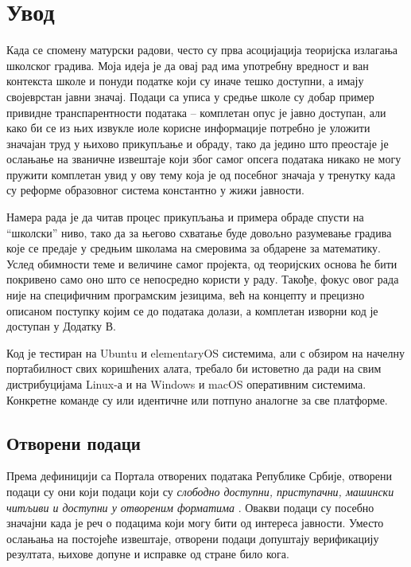 \chapter{Увод}\label{ch:\thechapter}

Када се спомену матурски радови, често су прва асоцијација теоријска излагања школског градива. Моја идеја је да овај рад има употребну вредност и ван контекста школе и понуди податке који су иначе тешко доступни, а имају својеврстан јавни значај. Подаци са уписа у средње школе су добар пример привидне транспарентности података -- комплетан опус је јавно доступан, али како би се из њих извукле иоле корисне информације потребно је уложити значајан труд у њихово прикупљање и обраду, тако да једино што преостаје је ослањање на званичне извештаје који због самог опсега података никако не могу пружити комплетан увид у ову тему која је од посебног значаја у тренутку када су реформе образовног система константно у жижи јавности.

Намера рада је да читав процес прикупљања и примера обраде спусти на \enquote{школски} ниво, тако да за његово схватање буде довољно разумевање градива које се предаје у средњим школама на смеровима за обдарене за математику. Услед обимности теме и величине самог пројекта, од теоријских основа ће бити покривено само оно што се непосредно користи у раду. Такође, фокус овог рада није на специфичним програмским језицима, већ на концепту и прецизно описаном поступку којим се до података долази, а комплетан изворни код је доступан у Додатку В.

Код је тестиран на Ubuntu и elementaryOS системима, али с обзиром на начелну портабилност свих коришћених алата, требало би истоветно да ради на свим дистрибуцијама Linux-а и на Windows и macOS оперативним системима. Конкретне команде су или идентичне или потпуно аналогне за све платформе.

\section{Отворени подаци}

Према дефиницији са Портала отворених података Републике Србије, отворени подаци су они који подаци који су \emph{слободно доступни, приступачни, машински читљиви и доступни у отвореним форматима} \citep{opendatadef}. Овакви подаци су посебно значајни када је реч о подацима који могу бити од интереса јавности. Уместо ослањања на постојеће извештаје, отворени подаци допуштају верификацију резултата, њихове допуне и исправке од стране било кога.

